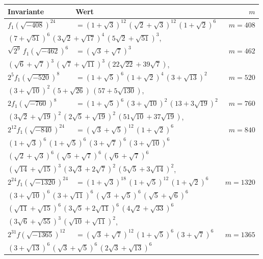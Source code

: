 \documentclass[12pt,a4paper]{article}
\begin{document}
\begin{longtable}{@{}llr@{}}
\toprule
\multicolumn{1}{l}{\textbf{Invariante}} & \multicolumn{1}{l}{\textbf{Wert}} & $m$ \\
\midrule
\endhead
$f_1(\sqrt{-408})^{24}$ &$= (1+\sqrt{3})^{12}\,(\sqrt{2}+\sqrt{3})^{12}\,(1+\sqrt{2})^6$ & $m=408$ \\
\multicolumn{3}{l}{\qquad$(7+\sqrt{51})^6\,(3\sqrt{2}+\sqrt{17})^4\,(5\sqrt{2}+\sqrt{51})^3$,} \\
$\sqrt{2^9}\,f_1(\sqrt{-462})^6$ &$= (\sqrt{3}+\sqrt{7})^3$ & $m=462$ \\
\multicolumn{3}{l}{\qquad$(\sqrt{6}+\sqrt{7})^3\,(\sqrt{7}+\sqrt{11})^3\,(22\sqrt{22}+39\sqrt{7})$,} \\
$2^5f_1(\sqrt{-520})^8$ &$= (1+\sqrt{5})^6\,(1+\sqrt{2})^4\,(3+\sqrt{13})^2$ & $m=520$ \\
\multicolumn{3}{l}{\qquad$(3+\sqrt{10})^2\,(5+\sqrt{26})\,(57+5\sqrt{130})$,} \\
$2f_1(\sqrt{-760})^8$ &$= (1+\sqrt{5})^6\,(3+\sqrt{10})^2\,(13+3\sqrt{19})^2$ & $m=760$ \\
\multicolumn{3}{l}{\qquad$(3\sqrt{2}+\sqrt{19})^2\,(2\sqrt{5}+\sqrt{19})^2\,(51\sqrt{10}+37\sqrt{19})$,} \\
$2^{12}f_1(\sqrt{-840})^{24}$ &$= (\sqrt{3}+\sqrt{5})^{12}\,(1+\sqrt{2})^6$ & $m=840$ \\
\multicolumn{3}{l}{\qquad$(1+\sqrt{3})^6\,(1+\sqrt{5})^6\,(3+\sqrt{7})^6\,(3+\sqrt{10})^6$} \\
\multicolumn{3}{l}{\qquad$(\sqrt{2}+\sqrt{3})^6\,(\sqrt{5}+\sqrt{7})^6\,(\sqrt{6}+\sqrt{7})^6$} \\
\multicolumn{3}{l}{\qquad$(\sqrt{14}+\sqrt{15})^3\,(3\sqrt{3}+2\sqrt{7})^2\,(5\sqrt{5}+3\sqrt{14})^2$,} \\
$2^{24}f_1(\sqrt{-1320})^{24}$ &$= (1+\sqrt{3})^{18}\,(1+\sqrt{5})^{12}\,(1+\sqrt{2})^6$ & $m=1320$ \\
\multicolumn{3}{l}{\qquad$(3+\sqrt{10})^6\,(3+\sqrt{11})^6\,(\sqrt{3}+\sqrt{5})^6\,(\sqrt{5}+\sqrt{6})^6$} \\
\multicolumn{3}{l}{\qquad$(\sqrt{11}+\sqrt{15})^6\,(3\sqrt{5}+2\sqrt{11})^6\,(4\sqrt{2}+\sqrt{33})^6$} \\
\multicolumn{3}{l}{\qquad$(3\sqrt{6}+\sqrt{55})^3\,(\sqrt{10}+\sqrt{11})^2$,} \\
$2^{31}f(\sqrt{-1365})^{12}$ &$= (\sqrt{3}+\sqrt{7})^{12}\,(1+\sqrt{5})^6\,(3+\sqrt{7})^6$ & $m=1365$ \\
\multicolumn{3}{l}{\qquad$(3+\sqrt{13})^6\,(\sqrt{3}+\sqrt{5})^6\,(2\sqrt{3}+\sqrt{13})^6$} \\

\end{longtable}
\end{document}
